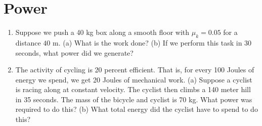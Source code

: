 \documentclass{article}
\begin{document}
\section{Power}

\begin{enumerate}
\item Suppose we push a 40 kg box along a smooth floor with $\mu_k = 0.05$ for a distance $40$ m.  (a) What is the work done? (b) If we perform this task in 30 seconds, what power did we generate? \\ \vspace{3cm}
\item The activity of cycling is 20 percent efficient.  That is, for every 100 Joules of energy we spend, we get 20 Joules of mechanical work.  (a) Suppose a cyclist is racing along at constant velocity.  The cyclist then climbs a 140 meter hill in 35 seconds.  The mass of the bicycle and cyclist is 70 kg.  What power was required to do this? (b) What total energy did the cyclist have to spend to do this?
\end{enumerate}
\end{document}

